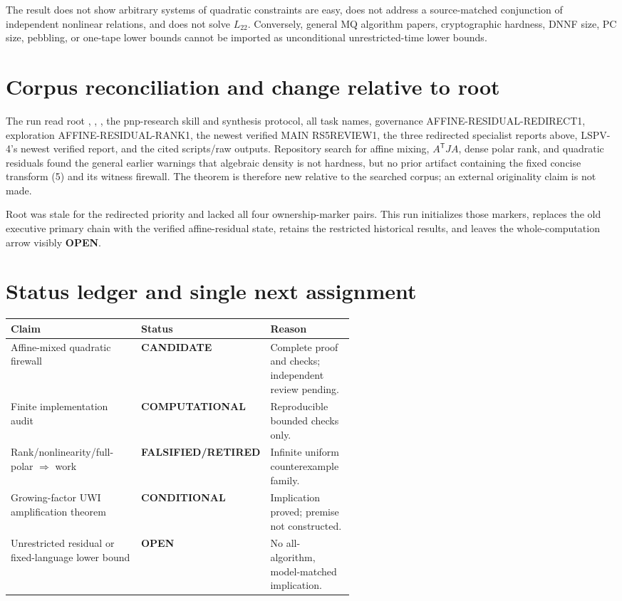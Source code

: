 \documentclass[11pt]{article}
\newcommand{\COMP}{\textbf{COMPUTATIONAL}}
\newcommand{\COND}{\textbf{CONDITIONAL}}
\newcommand{\CAND}{\textbf{CANDIDATE}}
\newcommand{\OPEN}{\textbf{OPEN}}
\newcommand{\RET}{\textbf{FALSIFIED/RETIRED}}
\begin{document}
The result does not show arbitrary systems of quadratic constraints are easy,
does not address a source-matched conjunction of independent nonlinear
relations, and does not solve $L_{22}$.  Conversely, general MQ algorithm papers,
cryptographic hardness, DNNF size, PC size, pebbling, or one-tape lower bounds
cannot be imported as unconditional unrestricted-time lower bounds.

\section{Corpus reconciliation and change relative to root}
The run read root , , , the
pnp-research skill and synthesis protocol, all task names, governance
AFFINE-RESIDUAL-REDIRECT1, exploration AFFINE-RESIDUAL-RANK1, the newest verified
MAIN RS5REVIEW1, the three redirected specialist reports above, LSPV-4's newest
verified report, and the cited scripts/raw outputs.  Repository search for
affine mixing, $A^{\mathsf T}JA$, dense polar rank, and quadratic residuals found
the general earlier warnings that algebraic density is not hardness, but no
prior artifact containing the fixed concise transform (5) and its witness
firewall.  The theorem is therefore new relative to the searched corpus; an
external originality claim is not made.

Root  was stale for the redirected priority and lacked all four
ownership-marker pairs.  This run initializes those markers, replaces the old
executive primary chain with the verified affine-residual state, retains the
restricted historical results, and leaves the whole-computation arrow visibly
\OPEN{}.

\section{Status ledger and single next assignment}
\begin{center}
\begin{tabularx}{0.98\linewidth}{p{0.38\linewidth}p{0.18\linewidth}X}
\toprule
Claim & Status & Reason \\
\midrule
Affine-mixed quadratic firewall & \CAND & Complete proof and checks; independent review pending.\\
Finite implementation audit & \COMP & Reproducible bounded checks only.\\
Rank/nonlinearity/full-polar $\Rightarrow$ work & \RET & Infinite uniform counterexample family.\\
Growing-factor UWI amplification theorem & \COND & Implication proved; premise not constructed.\\
Unrestricted residual or fixed-language lower bound & \OPEN & No all-algorithm, model-matched implication.\\
\bottomrule
\end{tabularx}
\end{center}
\end{document}
